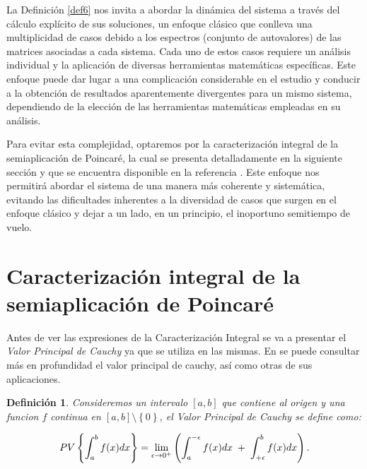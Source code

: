 \documentclass[12pt,a4paper]{report} %
\newtheorem{definicion}{Definición}[chapter]
\begin{document}
	
	\vspace{0.5cm}La Definición \ref{def6} nos invita a abordar la dinámica del sistema a través del cálculo explícito de sus soluciones, un enfoque clásico que conlleva una multiplicidad de casos debido a los espectros (conjunto de autovalores) de las matrices asociadas a cada sistema. Cada uno de estos casos requiere un análisis individual y la aplicación de diversas herramientas matemáticas específicas. Este enfoque puede dar lugar a una complicación considerable en el estudio y conducir a la obtención de resultados aparentemente divergentes para un mismo sistema, dependiendo de la elección de las herramientas matemáticas empleadas en su análisis.
	
	\vspace{0.5cm} Para evitar esta complejidad, optaremos por la caracterización integral de la semiaplicación de Poincaré, la cual se presenta detalladamente en la siguiente sección y que se encuentra disponible en la referencia \cite{caracterizacion}. Este enfoque nos permitirá abordar el sistema de una manera más coherente y sistemática, evitando las dificultades inherentes a la diversidad de casos que surgen en el enfoque clásico y dejar a un lado, en un principio, el inoportuno semitiempo de vuelo.
	\newpage
	
	\section{Caracterización integral de la semiaplicación de Poincaré}
	
	
	\vspace{0.5cm} Antes de ver las expresiones de la Caracterización Integral se va a presentar el \textit{Valor Principal de Cauchy} ya que se utiliza en las mismas. En \cite{pv} se puede consultar más en profundidad el valor principal de cauchy, así como otras de sus aplicaciones.
	
	\begin{definicion}
	
	 Consideremos un intervalo $[a,b]$ que contiene al origen y una funcion $f$ continua en $[a,b] \setminus \left\{0\right\}$, el Valor Principal de Cauchy se define como:
	
	\begin{equation}
		\scalebox{1}{$\displaystyle
			PV\left\{\int_{a}^{b}f(x)dx\right\}= \lim_{\epsilon \to 0^+}\left(
			\int_{a}^{-\epsilon}f(x)dx \; + \; 
			\int_{+\epsilon}^{b}f(x)dx
			\right).
			$}
	\end{equation}
	
    \end{definicion}
   
\end{document}
